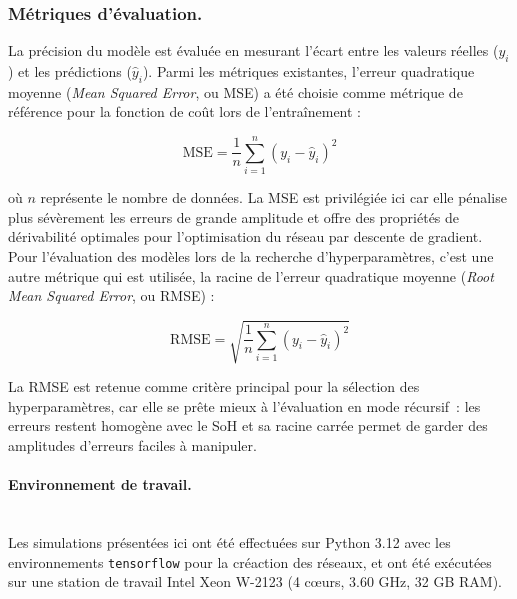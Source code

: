 \subsubsection{Métriques d'évaluation.}
La précision du modèle est évaluée en mesurant l'écart entre les valeurs réelles ($y_i$) et les prédictions ($\hat{y}_i$). Parmi les métriques existantes, l'erreur quadratique moyenne (\textit{Mean Squared Error}, ou MSE) a été choisie comme métrique de référence pour la fonction de coût lors de l'entraînement :

\begin{equation}
    \mathrm{MSE} = \frac{1}{n} \sum_{i=1}^{n} (y_i - \hat{y}_i)^2
\end{equation}

où $n$ représente le nombre de données. La MSE est privilégiée ici car elle pénalise plus sévèrement les erreurs de grande amplitude et offre des propriétés de dérivabilité optimales pour l'optimisation du réseau par descente de gradient. Pour l'évaluation des modèles lors de la recherche d'hyperparamètres, c'est une autre métrique qui est utilisée, la racine de l'erreur quadratique moyenne (\textit{Root Mean Squared Error}, ou RMSE) :
 
\begin{equation}
    \mathrm{RMSE} = \sqrt{\frac{1}{n} \sum_{i=1}^{n} (y_i - \hat{y}_i)^2}
    \label{eq:rmse}
\end{equation}
 
La RMSE est retenue comme critère principal pour la sélection des hyperparamètres, car elle se prête mieux à l'évaluation en mode récursif~: les erreurs restent homogène avec le SoH et sa racine carrée permet de garder des amplitudes d'erreurs faciles à manipuler. 

\paragraph{Environnement de travail.}\hfill \\
Les simulations présentées ici ont été effectuées sur Python 3.12 avec les environnements \texttt{tensorflow} pour la créaction des réseaux, et ont été exécutées sur une station de travail Intel Xeon W-2123 (4 c\oe urs, 3.60 GHz, 32 GB RAM).


